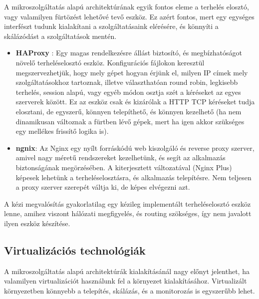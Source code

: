 \documentclass[11pt,magyar,a4paper,twoside,]{report}
\begin{document}
A mikroszolgáltatás alapú architektúrának egyik fontos eleme a terhelés
elosztó, vagy valamilyen fürtözést lehetővé tevő eszköz. Ez azért
fontos, mert egy egységes interfészt tudunk kialakítani a
szolgáltatásaink elérésére, és könnyíti a skálázódást a szolgáltatások
mentén.

\begin{itemize}
\item
  \textbf{HAProxy}\citep{haproxy} \citep{LB-haproxy}: Egy magas
  rendelkezésre állást biztosító, és megbízhatóságot növelő
  terheléselosztó eszköz. Konfigurációs fájlokon keresztül
  megszervezhetjük, hogy mely gépet hogyan érjünk el, milyen IP címek
  mely szolgáltatásokhoz tartoznak, illetve választhatóan round robin,
  legkisebb terhelés, session alapú, vagy egyéb módon osztja szét a
  kéréseket az egyes szerverek között. Ez az eszköz csak és kizárólak a
  HTTP TCP kéréseket tudja elosztani, de egyszerű, könnyen telepíthető,
  és könnyen kezelhető (ha nem dinamikusan változnak a fürtben lévő
  gépek, mert ha igen akkor szükséges egy mellékes frissítő logika is).
\item
  \textbf{ngnix}\citep{nginx}: Az Nginx egy nyílt forráskódú web
  kiszolgáló és reverse proxy szerver, amivel nagy méretű rendszereket
  kezelhetünk, és segít az alkalmazás biztonságának megörzésében. A
  kiterjesztett változatával (Nginx Plus) képesek lehetünk a
  terheléselosztásra, és alkalmazás telepítésre. Nem teljesen a proxy
  szerver szerepét váltja ki, de képes elvégezni azt.
\end{itemize}

A kézi megvalósítás gyakorlatilag egy kézileg implementált
terheléselosztó eszköz lenne, amihez viszont hálózati megfigyelés, és
routing szökséges, így nem javalott ilyen eszköz készítése.

\subsection{Virtualizációs
technológiák}\label{virtualizuxe1ciuxf3s-technoluxf3giuxe1k}

A mikroszolgáltatás alapú architektúrák kialakításánál nagy előnyt
jelenthet, ha valamilyen virtualizációt használunk fel a környezet
kialakításához. Virtualizált környezetben könnyebb a telepítés,
skálázás, és a monitorozás is egyszerűbb lehet.
\end{document}
